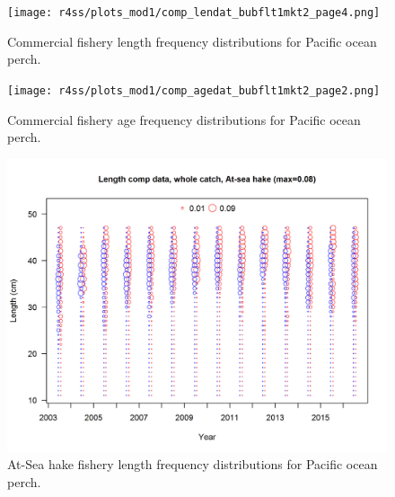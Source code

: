 \documentclass[12pt,]{article}
\begin{document}
\FloatBarrier

\begin{figure}
\centering
\texttt{[image: r4ss/plots\_mod1/comp\_lendat\_bubflt1mkt2\_page4.png]}
\caption{Commercial fishery length frequency distributions for Pacific
ocean perch. \label{fig:Comm_Length}}
\end{figure}

\FloatBarrier

\begin{figure}
\centering
\texttt{[image: r4ss/plots\_mod1/comp\_agedat\_bubflt1mkt2\_page2.png]}
\caption{Commercial fishery age frequency distributions for Pacific
ocean perch. \label{fig:Comm_Age}}
\end{figure}

\FloatBarrier

\begin{figure}
\centering
\includegraphics{r4ss/plots_mod1/comp_lendat_bubflt2mkt0.png}
\caption{At-Sea hake fishery length frequency distributions for Pacific
ocean perch. \label{fig:ASHOP_Length}}
\end{figure}

\FloatBarrier
\end{document}
